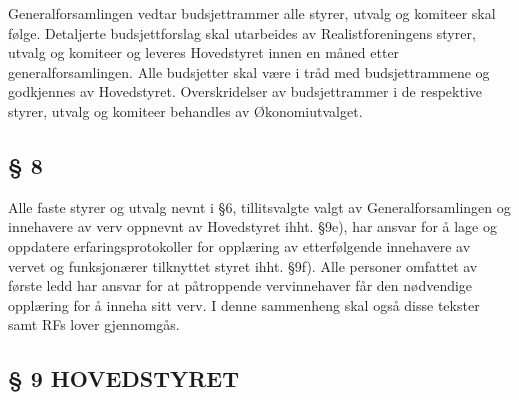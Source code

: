 Generalforsamlingen vedtar budsjettrammer alle styrer, utvalg og
komiteer skal følge.  Detaljerte budsjettforslag skal utarbeides av
Realistforeningens styrer, utvalg og komiteer og leveres Hovedstyret
innen en måned etter generalforsamlingen.  Alle budsjetter skal være i
tråd med budsjettrammene og godkjennes av Hovedstyret.  Overskridelser
av budsjettrammer i de respektive styrer, utvalg og komiteer behandles
av Økonomiutvalget.

\subsection*{§ 8}

Alle faste styrer og utvalg nevnt i §6, tillitsvalgte valgt av Generalforsamlingen og innehavere av verv
oppnevnt av Hovedstyret ihht. §9e), har ansvar for å lage og oppdatere erfaringsprotokoller
for opplæring av etterfølgende
innehavere av vervet og funksjonærer tilknyttet
styret ihht. §9f). Alle personer omfattet av første ledd har ansvar for at påtroppende vervinnehaver får den
nødvendige opplæring for å inneha sitt verv.
I denne sammenheng skal også disse tekster samt RFs lover gjennomgås.

\subsection*{§ 9 HOVEDSTYRET}

